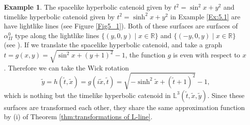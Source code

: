 \documentclass[12pt,amstex]{amsart}%
\theoremstyle{plain} %
\theoremstyle{definition}
\newtheorem{example}[theorem]{Example}
\begin{document}
\begin{example}\label{Ex:5.4}
The spacelike hyperbolic catenoid given by $t^2=\sin^2{x}+y^2$ and timelike hyperbolic catenoid given by $t^2=\sinh^2{x}+y^2$ in Example \ref{Ex:5.1} are have lightlike lines (see Figure \ref{Fig5_1}). Both of these surfaces are surfaces of $\alpha^0_{II}$ type along the lightlike lines $\{(y,0,y)\mid x\in \mathbb{R}\}$ and $\{(-y,0,y)\mid x\in \mathbb{R}\}$ (see \cite[Example 2]{FujimoriETAL1}). If we translate the spacelike hyperbolic catenoid, and take a graph $t=g(x,y)=\sqrt{\sin^2{x}+(y+1)^2}-1$, the function $g$ is even with respect to $x$. Therefore we can take the Wick rotation
\[ 
\tilde{y}=h(\tilde{t},\tilde{x})=g(i\tilde{x},\tilde{t})=\sqrt{-\sinh^2{\tilde{x}}+(\tilde{t}+1)^2}-1,
\]
which is nothing but the timelike hyperbolic catenoid in $\mathbb{L}^3(\tilde{t},\tilde{x},\tilde{y})$. Since these surfaces are transformed each other, they share the same approximation function by (i) of Theorem \ref{thm:transformations of L-line}.
\end{example}
\end{document}
